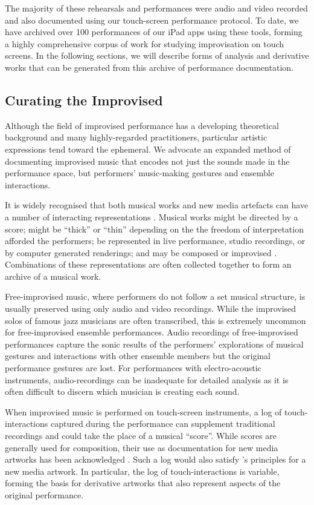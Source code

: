 \documentclass[graybox]{svmult}
\begin{document}
The majority of these rehearsals and performances were audio and video
recorded and also documented using our touch-screen performance
protocol. To date, we have archived over 100 performances of our iPad
apps using these tools, forming a highly comprehensive corpus of work
for studying improvisation on touch screens. In the following
sections, we will describe forms of analysis and derivative works that
can be generated from this archive of performance documentation.

\subsection{Curating the Improvised}
\label{subsec:curating}

Although the field of improvised performance has a developing
theoretical background and many highly-regarded practitioners,
particular artistic expressions tend toward the ephemeral. We advocate
an expanded method of documenting improvised music that encodes not
just the sounds made in the performance space, but performers'
music-making gestures and ensemble interactions.

It is widely recognised that both musical works and new media
artefacts can have a number of interacting
representations \citep{Rinehart:2007pi}. Musical works might be
directed by a score; might be ``thick'' or ``thin'' depending on the
the freedom of interpretation afforded the performers; be represented
in live performance, studio recordings, or by computer generated
renderings; and may be composed or improvised \citep{Davies:2005fj}.
Combinations of these representations are often collected together to
form an archive of a musical work.

Free-improvised music, where performers do not follow a set musical
structure, is usually preserved using only audio and video recordings.
While the improvised solos of famous jazz musicians are often
transcribed, this is extremely uncommon for free-improvised ensemble
performances. Audio recordings of free-improvised performances capture
the sonic results of the performers' explorations of musical gestures
and interactions with other ensemble members but the original
performance gestures are lost. For performances with electro-acoustic
instruments, audio-recordings can be inadequate for detailed analysis
as it is often difficult to discern which musician is creating each
sound.

When improvised music is performed on touch-screen instruments, a log
of touch-interactions captured during the performance can supplement
traditional recordings and could take the place of a musical
``score''. While scores are generally used for composition, their use
as documentation for new media artworks has been
acknowledged \citep{MacDonald:2009ve}. Such a log would also satisfy
\citeauthor{Manovich:2002ly}'s \citeyearpar{Manovich:2002ly} principles for a new media artwork.
In particular, the log of touch-interactions is variable, forming the
basis for derivative artworks that also represent aspects of the
original performance.
\end{document}
